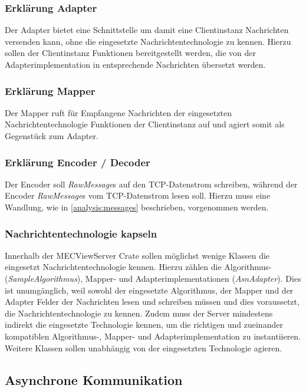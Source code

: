 \documentclass[
	12pt,
	table,
	bigheadings,
	ngerman,
	a4paper,
	BCOR5mm,
	DIV14,
	1.1headlines,
	pagesize,
	oneside,
	openright,
	titlepage,
	headsepline,
	nochapterprefix,
	bibtotoc,
	tocindent,
	listsindent,
	pointlessnumbers,
	cleardoubleempty,
	fleqn,
	halfparskip
]{scrbook}
\begin{document}
		\subsubsection{Erklärung Adapter}
		
		Der Adapter bietet eine Schnittstelle um damit eine Clientinstanz Nachrichten versenden kann, ohne die eingesetzte Nachrichtentechnologie zu kennen.
		Hierzu sollen der Clientinstanz Funktionen bereitgestellt werden, die von der Adapterimplementation in entsprechende Nachrichten übersetzt werden.
		
		\subsubsection{Erklärung Mapper}
		
		Der Mapper ruft für Empfangene Nachrichten der eingesetzten Nachrichtentechnologie Funktionen der Clientinstanz auf und agiert somit als Gegenstück zum Adapter.
		
		\subsubsection{Erklärung Encoder / Decoder}
		
		Der Encoder soll \textit{RawMessage}s auf den TCP-Datenstrom schreiben, während der Encoder \textit{RawMessage}s vom TCP-Datenstrom lesen soll.
		Hierzu muss eine Wandlung, wie in \autoref{analysis:messages} beschrieben, vorgenommen werden.
		
		\subsubsection{Nachrichtentechnologie kapseln}
		
		Innerhalb der MECViewServer Crate sollen möglichst wenige Klassen die eingesetzt Nachrichtentechnologie kennen.
		Hierzu zählen die Algorithmus- (\textit{SampleAlgorithmus}), Mapper- und Adapterimplementationen (\textit{AsnAdapter}).
		Dies ist unumgänglich, weil sowohl der eingesetzte Algorithmus, der Mapper und der Adapter Felder der Nachrichten lesen und schreiben müssen und dies voraussetzt, die Nachrichtentechnologie zu kennen.
		Zudem muss der Server mindestens indirekt die eingesetzte Technologie kennen, um die richtigen und zueinander kompatiblen Algorithmus-, Mapper- und Adapterimplementation zu instantiieren.
		Weitere Klassen sollen unabhängig von der eingesetzten Technologie agieren.
		
		\subsection{Asynchrone Kommunikation}
		
\end{document}
